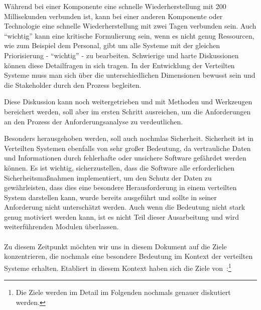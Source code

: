 \documentclass[../vs-script-first-v01.tex]{subfiles}
\begin{document}
Während bei einer Komponente eine schnelle Wiederherstellung mit 200 Millisekunden verbunden ist, kann bei einer anderen Komponente oder Technologie eine schnelle Wiederherstellung mit zwei Tagen verbunden sein. Auch \enquote{wichtig} kann eine kritische Formulierung sein, wenn es nicht genug Ressourcen, wie zum Beispiel dem Personal, gibt um alle Systeme mit der gleichen Priorisierung - \enquote{wichtig} - zu bearbeiten. Schwierige und harte Diskussionen können diese Detailfragen in sich tragen. In der Entwicklung der Verteilten Systeme muss man sich über die unterschiedlichen Dimensionen bewusst sein und die Stakeholder durch den Prozess begleiten.

Diese Diskussion kann noch weitergetrieben und mit Methoden und Werkzeugen bereichert werden, soll aber im ersten Schritt ausreichen, um die Anforderungen an den Prozess der Anforderungsanalyse zu verdeutlichen. 

Besonders herausgehoben werden, soll auch nochmlas Sicherheit. Sicherheit ist in Verteilten Systemen ebenfalls von sehr großer Bedeutung, da vertrauliche Daten und Informationen durch fehlerhafte oder unsichere Software gefährdet werden können. Es ist wichtig, sicherzustellen, dass die Software alle erforderlichen Sicherheitsmaßnahmen implementiert, um den Schutz der Daten zu gewährleisten, dass dies eine besondere Herausforderung in einem verteilten System darstellen kann, wurde bereits ausgeführt und sollte in seiner Anforderung nicht unterschätzt werden. Auch wenn die Bedeutung nicht stark genug motiviert werden kann, ist es nicht Teil dieser Ausarbeitung und wird weiterführenden Modulen überlassen.
\\\\
Zu diesem Zeitpunkt möchten wir uns in diesem Dokument auf die Ziele konzentrieren, die nochmals eine besondere Bedeutung im Kontext der verteilten Systeme erhalten. Etabliert in diesem Kontext haben sich die Ziele von~\cite{tanenbaum2017distributed}:\footnote{Die Ziele werden im Detail im Folgenden nochmals genauer diskutiert werden.}
\end{document}
